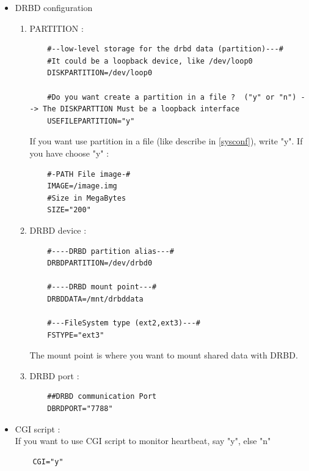 \documentclass[a4paper,10pt]{report}
\begin{document}
\begin{itemize}
 \item DRBD configuration
\begin{enumerate}
 \item PARTITION :\\
  \begin{lstlisting}
    #--low-level storage for the drbd data (partition)---#
    #It could be a loopback device, like /dev/loop0
    DISKPARTITION=/dev/loop0

    #Do you want create a partition in a file ?  ("y" or "n") --> The DISKPARTTION Must be a loopback interface
    USEFILEPARTITION="y"
  \end{lstlisting}
If you want use partition in a file (like describe in \ref{sysconf}), write "y". If you have choose "y" :
  \begin{lstlisting}
    #-PATH File image-#
    IMAGE=/image.img
    #Size in MegaBytes
    SIZE="200"
  \end{lstlisting}
  
  \item DRBD device :\\
  \begin{lstlisting}
    #----DRBD partition alias---#
    DRBDPARTITION=/dev/drbd0

    #----DRBD mount point---#
    DRBDDATA=/mnt/drbddata

    #---FileSystem type (ext2,ext3)---#
    FSTYPE="ext3"
  \end{lstlisting}
The mount point is where you want to mount shared data with DRBD.

  \item DRBD port :\\
  \begin{lstlisting}
    ##DRBD communication Port
    DBRDPORT="7788"
  \end{lstlisting}
  
\end{enumerate}

\item CGI script :\\
  If you want to use CGI script to monitor heartbeat, say "y", else "n"
  \begin{lstlisting}
    CGI="y"
  \end{lstlisting}

\end{itemize}
\end{document}
